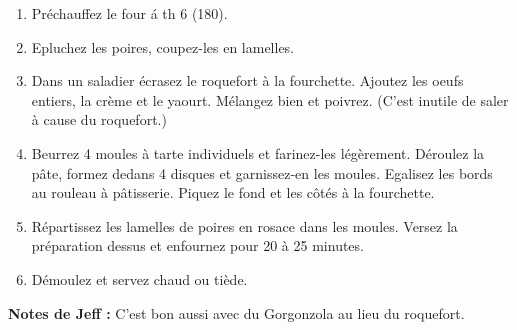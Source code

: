 
\begin{ingredients}
\end{ingredients}


\begin{recipe}
  \begin{enumerate}

  \item Pr\'echauffez le four \'a th 6 (180\C).

  \item Epluchez les poires, coupez-les en lamelles.

  \item Dans un saladier \'ecrasez le roquefort \`a la fourchette.
    Ajoutez les oeufs entiers, la cr\`eme et le yaourt.  M\'elangez
    bien et poivrez.  (C'est inutile de saler \`a cause du roquefort.)

  \item Beurrez 4 moules \`a tarte individuels et farinez-les
    l\'eg\`erement.  D\'eroulez la p\^ate, formez dedans 4 disques et
    garnissez-en les moules.  Egalisez les bords au rouleau \`a
    p\^atisserie.  Piquez le fond et les c\^ot\'es \`a la fourchette.

  \item R\'epartissez les lamelles de poires en rosace dans les
    moules.  Versez la pr\'eparation dessus et enfournez pour 20 \`a
    25 minutes.

  \item D\'emoulez et servez chaud ou ti\`ede.

  \end{enumerate}

  \textbf{Notes de Jeff :} C'est bon aussi avec du Gorgonzola au lieu
  du roquefort.

\end{recipe}
